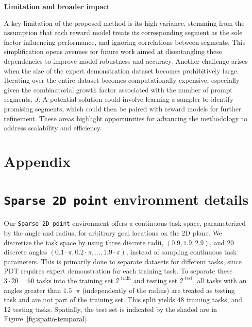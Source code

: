 \documentclass{article} %
\begin{document}
\textbf{Limitation and broader impact}

A key limitation of the proposed method is its high variance, stemming from the assumption that each reward model treats its corresponding segment as the sole factor influencing performance, and ignoring correlations between segments. This simplification opens avenues for future work aimed at disentangling these dependencies to improve model robustness and accuracy. Another challenge arises when the size of the expert demonstration dataset becomes prohibitively large. Iterating over the entire dataset becomes computationally expensive, especially given the combinatorial growth factor associated with the number of prompt segments, $J$. A potential solution could involve learning a sampler to identify promising segments, which could then be paired with reward models for further refinement. These areas highlight opportunities for advancing the methodology to address scalability and efficiency.






\clearpage
\onecolumn
\appendix

\section*{Appendix}

\section{\texttt{Sparse 2D point} environment details}\label{app:2D-env-task-split}
Our \texttt{Sparse 2D point} environment offers a continuous task space, parameterized by the angle and radius, for arbitrary goal locations on the 2D plane.
We discretize the task space by using three discrete radii, $(0.9, 1.9, 2.9)$, and 20 discrete angles $(0.1 \cdot \pi, 0.2 \cdot \pi, \dots, 1.9 \cdot \pi)$, instead of sampling continuous task parameters. 
This is primarily done to separate datasets for different tasks, since PDT requires expert demonstration for each training task. 
To separate these $3 \cdot 20 = 60$ tasks into the training set $\mathcal{T}^\text{train}$ and testing set $\mathcal{T}^\text{test}$, all tasks with an angles greater than $1.5 \cdot \pi$ (independently of the radius) are treated as testing task and are not part of the training set.
This split yields 48 training tasks, and 12 testing tasks. 
Spatially, the test set is indicated by the shaded are in Figure~\ref{fig:spatio-temporal}.
\end{document}
